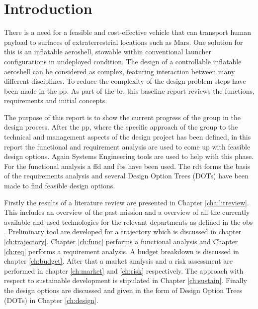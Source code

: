 \section{Introduction}\label{cha:introduction}
There is a need for a feasible and cost-effective vehicle that can transport human payload to surfaces of extraterrestrial locations such as Mars. One solution for this is an inflatable aeroshell, stowable within conventional launcher configurations in undeployed condition. The design of a controllable inflatable aeroshell can be considered as complex, featuring interaction between many different disciplines. To reduce the complexity of the design problem steps have been made in the \gls{pp}. As part of the \gls{br}, this baseline report reviews the functions, requirements and initial concepts.

The purpose of this report is to show the current progress of the group in the design process. After the \gls{pp}, where the specific approach of the group to the technical and management aspects of the design project has been defined, in this report the functional and requirement analysis are used to come up with feasible design options. Again Systems Engineering tools are used to help with this phase. For the functional analysis a \acrfull{ffd} and \acrfull{fbs} have been used. The \acrfull{rdt} forms the basis of the requirements analysis and several Design Option Trees (DOTs) have been made to find feasible design options.

Firstly the results of a literature review are presented in Chapter \ref{cha:litreview}. This includes an overview of the past mission and a overview of all the currently available and used technologies for the relevant departments as defined in the \gls{obs} \cite{Balasooriyan2015}. Preliminary tool are developed for a trajectory which is discussed in chapter \ref{ch:trajectory}. Chapter \ref{ch:func} performs a functional analysis and Chapter \ref{ch:req} performs a requirement analysis. A budget breakdown is discussed in chapter \ref{ch:budget}. After that a market analysis and a risk assessment are performed in chapter \ref{ch:market} and \ref{ch:risk} respectively. The approach with respect to sustainable development is stipulated in Chapter \ref{ch:sustain}. Finally the design options are discussed and given in the form of Design Option Trees (DOTs) in Chapter \ref{ch:design}. 



